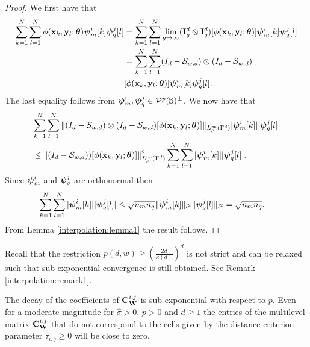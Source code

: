 \documentclass[11pt,final]{amsart}       %
\begin{document}
\begin{proof} 
We first have that
\[
\begin{split}
\sum_{k = 1}^{N} 
\sum_{l = 1}^{N} 
\phi(\mathbf{x}_k,\mathbf{y}_l; \boldsymbol{\theta}) 
\boldsymbol{\psi}^i_m[k] \boldsymbol{\psi}^j_q[l] 
&=
\sum_{k = 1}^{N} 
\sum_{l = 1}^{N}
\lim_{g \rightarrow \infty}
(\mathbf{I}^d_{g}
\otimes
\mathbf{I}^d_{g})[
\phi(\mathbf{x}_k,\mathbf{y}_l; \boldsymbol{\theta})] 
\boldsymbol{\psi}^i_m[k] \boldsymbol{\psi}^j_q[l] \\
&=
\sum_{k = 1}^{N} 
\sum_{l = 1}^{N}
(I_d - \mathcal{S}_{w,d}) 
\otimes
(I_d - \mathcal{S}_{w,d}) \\
&[\phi(\mathbf{x}_k,\mathbf{y}_l; \boldsymbol{\theta})] 
\boldsymbol{\psi}^i_m[k] \boldsymbol{\psi}^j_q[l].
\end{split}
\]
The last equality follows from $\boldsymbol{\psi}^{i}_m, \boldsymbol{\psi}^{j}_{q} \in {\mathcal P}^{
  p}(\mathbb{S})^{\perp}$. We now have that
\[
\begin{split}
& \sum_{k = 1}^{N} 
\sum_{l = 1}^{N}
\|(I_d - \mathcal{S}_{w,d}) 
\otimes
(I_d - \mathcal{S}_{w,d})
[\phi(\mathbf{x}_k,\mathbf{y}_l; \boldsymbol{\theta})] \|_{L^{\infty}_{\rho}(\Gamma^d)}
|\boldsymbol{\psi}^i_m[k]| |\boldsymbol{\psi}^j_q[l]|
\\
&\leq 
\|(I_d - \mathcal{S}_{w,d}))[\phi(\mathbf{x}_k,\mathbf{y}_l; \boldsymbol{\theta})] \|^{2}_{L^{\infty}_{\rho}(\Gamma^d)}
\sum_{k = 1}^{N} 
\sum_{l = 1}^{N}
|\boldsymbol{\psi}^i_m[k]| |\boldsymbol{\psi}^j_q[l]|.
\end{split}
\]
Since $\boldsymbol{\psi}^i_m$ and $\boldsymbol{\psi}^j_q$ are orthonormal then
\[
\begin{split}
\sum_{k = 1}^{N} 
\sum_{l = 1}^{N}
|\boldsymbol{\psi}^i_m[k]| |\boldsymbol{\psi}^j_q[l]|
&\leq \sqrt{n_m n_q}
\|\boldsymbol{\psi}^i_m[k]\|_{l^2} \|\boldsymbol{\psi}^j_q[l]\|_{l^2} =
\sqrt{n_m n_q}.
\end{split}
\]
From Lemma \ref{interpolation:lemma1} the result follows.
\end{proof}



\begin{remark} Recall that the restriction $p(d,w) \geq \left(\frac{2
  d}{\kappa(d)}\right)^{d}$ is not strict and can be relaxed such that
  sub-exponential convergence is still obtained. See Remark
  \ref{interpolation:remark1}.
\end{remark}

\begin{remark}
  The decay of the coefficients of $\mathbf{C}^{i,j}_{\mathbf{W}}$ is sub-exponential
  with respect to $p$.  Even for a moderate magnitude for $\hat
  \sigma > 0$, $p > 0$ and $d \geq 1$ the entries of the
  multilevel matrix $\mathbf{C}^{i,j}_{\mathbf{W}}$ that do not correspond to the
  cells given by the distance criterion parameter $\tau_{i,j} \geq 0$
  will be close to zero.
\end{remark}
\end{document}
